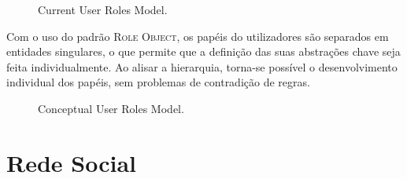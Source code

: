 \documentclass[9pt,a4paper]{extarticle}
\begin{document}
\begin{multicols}{2}

\begin{figure}[H]
  \caption{Current User Roles Model.}
  \label{fig:user_roles_current}
\end{figure}


Com o uso do padrão \textsc{Role Object}, os papéis do utilizadores são separados em entidades singulares, o que permite que a definição das suas abstrações chave seja feita individualmente. Ao alisar a hierarquia, torna-se possível o desenvolvimento individual dos papéis, sem problemas de contradição de regras.

\begin{figure}[H]
  \caption{Conceptual User Roles Model.}
  \label{fig:user_roles_conceptual}
\end{figure}

\section{Rede Social}\label{sec:social_network}



\end{multicols}
\end{document}
